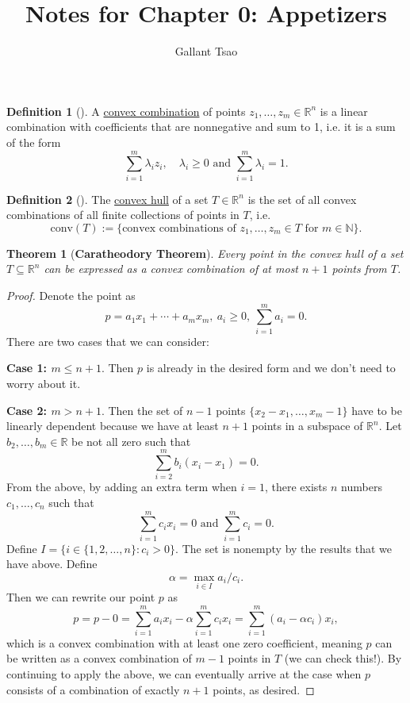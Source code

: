 \documentclass{article}
\title{Notes for Chapter 0: Appetizers}
\author{Gallant Tsao}
\newtheorem*{theorem}{Theorem}
\theoremstyle{definition}
\newtheorem*{definition}{Definition}
\begin{document}
\maketitle


\begin{definition}[]
A \underline{convex combination} of points $z_1, \dots, z_m \in \mathbb{R}^n$ is a linear combination with coefficients 
that are nonnegative and sum to 1, i.e. it is a sum of the form
\[ \sum_{i = 1}^{m} \lambda_i z_i, \quad \lambda_i \geq 0 \text{  and  } \sum_{i = 1}^{m} \lambda_i = 1. \]
\end{definition}

\begin{definition}[]
The \underline{convex hull} of a set $T \in \mathbb{R}^n$ is the set of all convex combinations of all finite 
collections of points in $T$, i.e. 
\[ \text{conv}(T) := \{\text{convex combinations of } z_1, \dots, z_m \in T \text{ for } m \in \mathbb{N}\}. \]
\end{definition}

\begin{theorem}[\textbf{Caratheodory Theorem}]
Every point in the convex hull of a set $T \subseteq \mathbb{R}^n$ can be expressed as a convex combination of at most 
$n + 1$ points from $T$.
\end{theorem}
\begin{proof}
Denote the point as 
\[ p = a_1 x_1 + \cdots + a_m x_m, \ a_i \geq 0, \ \sum_{i = 1}^{m} a_i = 0. \]
There are two cases that we can consider: 

\textbf{Case 1: $m \leq n + 1$}. Then $p$ is already in the desired form and we don't need to worry about it.

\textbf{Case 2: $m > n + 1$}. Then the set of $n - 1$ points $\{x_2 - x_1, \dots, x_m - 1\}$ have to be linearly 
dependent because we have at least $n + 1$ points in a subspace of $\mathbb{R}^n$. Let $b_2, \dots, b_m \in \mathbb{R}$ 
be not all zero such that 
\[ \sum_{i = 2}^{m} b_i (x_i - x_1) = 0. \]
From the above, by adding an extra term when $i = 1$, there exists $n$ numbers $c_1, \dots, c_n$ such that 
\[ \sum_{i = 1}^{m} c_i x_i = 0 \text{  and  } \sum_{i = 1}^{m} c_i = 0. \]
Define $I = \{i \in \{1, 2, \dots, n\}: c_i > 0\}$. The set is nonempty by the results that we have above. Define 
\[ \alpha = \max_{i \in I} a_i / c_i. \]
Then we can rewrite our point $p$ as 
\[ p = p - 0 = \sum_{i = 1}^{m} a_i x_i - \alpha \sum_{i = 1}^{m} c_i x_i = \sum_{i = 1}^{m} (a_i - \alpha c_i)x_i, \]
which is a convex combination with at least one zero coefficient, meaning $p$ can be written as a convex combination 
of $m - 1$ points in $T$ (we can check this!). By continuing to apply the above, we can eventually arrive 
at the case when $p$ consists of a combination of exactly $n + 1$ points, as desired.
\end{proof}
\end{document}
